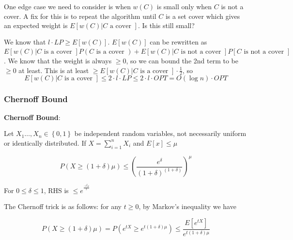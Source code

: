 \documentclass[../notes.tex]{subfiles}
\begin{document}
\begin{blockquote}
    One edge case we need to consider is when $ w(C) $ is small only when $ C $ is not a cover.
    A fix for this is to repeat the algorithm until $ C $ is a set cover which gives an expected weight is $ E[w(C) | C \text{ a cover }] $. Is this still small?

    We know that $ l \cdot  LP \ge  E[w(C)] $. $ E[w(C)] $ can be rewritten as $ E[w(C) | C \text{ is a cover }] P(C \text{ is a cover }) + E[w(C) | C \text{ is not a cover }] P[C \text{ is not a cover }] $. We know that the weight is always $ \ge 0 $, so we can bound the 2nd term to be $ \ge 0 $ at least.
    This is at least $ \ge  E[w(C) | C \text{ is a cover }] \cdot  \frac{1}{2} $, so
    \begin{equation}
        E[w(C) | C \text{ is a cover }] \le  2 \cdot l \cdot LP \le  2 \cdot  l \cdot  OPT = O(\log n) \cdot  OPT
    \end{equation}
    

\end{blockquote}








\subsubsection{Chernoff Bound}


\begin{definition}
    \textbf{Chernoff Bound}: 

Let $ X_1 \ldots,  X_n \in \left\{ 0, 1 \right\}  $ be independent random variables, not necessarily uniform or identically distributed. If $ X = \sum^n_{i=1} X_i $ and $ E[x] \le \mu $

\begin{equation}
    P(X \ge (1+\delta)\mu) \le  (\frac{e^\delta}{(1+\delta)^{(1+\delta)}})^\mu
\end{equation}

For $ 0 \le  \delta \le  1 $, RHS is $ \le e^{^\frac{-\delta^2\mu}{3}} $

\end{definition}


The Chernoff trick is as follows: for any $ t\ge 0 $, by Markov's inequality we have


\begin{equation}
    P(X \ge (1+\delta) \mu) = P(e^{tX} \ge e^{t(1+\delta)\mu}) \le \frac{E[e^{tX}]}{e^{t(1+\delta)\mu}}
\end{equation}
\end{document}
